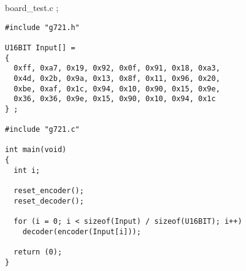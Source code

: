 board\_test.c ;

\begin{verbatim}
#include "g721.h"

U16BIT Input[] = 
{
  0xff, 0xa7, 0x19, 0x92, 0x0f, 0x91, 0x18, 0xa3,
  0x4d, 0x2b, 0x9a, 0x13, 0x8f, 0x11, 0x96, 0x20,
  0xbe, 0xaf, 0x1c, 0x94, 0x10, 0x90, 0x15, 0x9e,
  0x36, 0x36, 0x9e, 0x15, 0x90, 0x10, 0x94, 0x1c
} ;

#include "g721.c"

int main(void)
{
  int i;

  reset_encoder();
  reset_decoder();

  for (i = 0; i < sizeof(Input) / sizeof(U16BIT); i++)
    decoder(encoder(Input[i]));

  return (0);
}
\end{verbatim}
